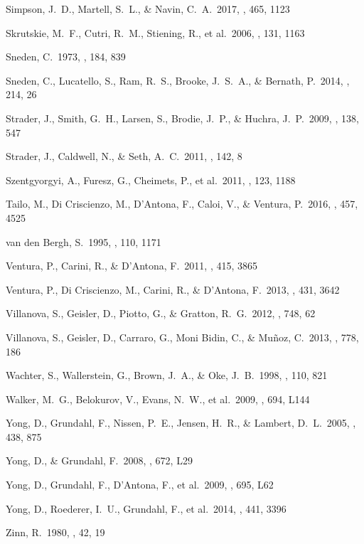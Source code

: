 \documentclass[12pt,preprint]{emulateapj}
\begin{document}
\begin{thebibliography}{}
 Simpson, J.~D., Martell, S.~L., \& Navin, C.~A.\ 2017, \mnras, 465, 1123

 Skrutskie, M.~F., Cutri, R.~M., Stiening, R., et al.\ 2006, \aj, 131, 1163

 Sneden, C.\ 1973, \apj, 184, 839

 Sneden, C., Lucatello, S., Ram, R.~S., Brooke, J.~S.~A., \& Bernath, P.\ 2014, \apjs, 214, 26 

 Strader, J., Smith, G.~H., Larsen, S., Brodie, J.~P., \& Huchra, J.~P.\ 2009, \aj, 138, 547

 Strader, J., Caldwell, N., \& Seth, A.~C.\ 2011, \aj, 142, 8

 Szentgyorgyi, A., Furesz, G., Cheimets, P., et al.\ 2011, \pasp, 123, 1188

 Tailo, M., Di Criscienzo, M., D'Antona, F., Caloi, V., \& Ventura, P.\ 2016, \mnras, 457, 4525

 van den Bergh, S.\ 1995, \aj, 110, 1171

 Ventura, P., Carini, R., \& D'Antona, F.\ 2011, \mnras, 415, 3865

 Ventura, P., Di Criscienzo, M., Carini, R., \& D'Antona, F.\ 2013, \mnras, 431, 3642

 Villanova, S., Geisler, D., Piotto, G., \& Gratton, R.~G.\ 2012, \apj, 748, 62

 Villanova, S., Geisler, D., Carraro, G., Moni Bidin, C., \& Mu{\~n}oz, C.\ 2013, \apj, 778, 186

 Wachter, S., Wallerstein, G., Brown, J.~A., \& Oke, J.~B.\ 1998, \pasp, 110, 821

 Walker, M.~G., Belokurov, V., Evans, N.~W., et al.\ 2009, \apjl, 694, L144

 Yong, D., Grundahl, F., Nissen, P.~E., Jensen, H.~R., \& Lambert, D.~L.\ 2005, \aap, 438, 875

 Yong, D., \& Grundahl, F.\ 2008, \apjl, 672, L29

 Yong, D., Grundahl, F., D'Antona, F., et al.\ 2009, \apjl, 695, L62

 Yong, D., Roederer, I.~U., Grundahl, F., et al.\ 2014, \mnras, 441, 3396

 Zinn, R.\ 1980, \apjs, 42, 19

\end{thebibliography}

\clearpage

\clearpage

\clearpage

\clearpage
\setlength{\hoffset}{-0.80in}

\clearpage
\setlength{\hoffset}{-0.80in}

\end{document}
